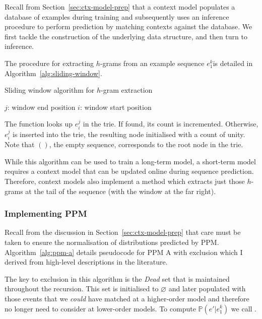\documentclass[12pt,a4paper,twoside,openright]{report}
\newcommand{\sref}[1]{Section~\ref{#1}}
\begin{document}
Recall from \sref{sec:ctx-model-prep} that a context model populates a
database of examples during training and subsequently uses an inference
procedure to perform prediction by matching contexts against the database. We
first tackle the construction of the underlying data structure, and then turn to
inference.

The procedure for extracting $h$-grams from an example sequence $e_1^k$is
detailed in Algorithm~\ref{alg:sliding-window}.

\begin{algorithm}[H]
  \caption{Sliding window algorithm for $h$-gram extraction}
  \label{alg:sliding-window}
  \begin{algorithmic}[1]
      \Comment $j$: window end position
        \State {}
        \Comment $i$: window start position
          \State {}
        \EndFor
      \EndFor
    \EndFunction
  \end{algorithmic}
\end{algorithm}

The function  looks up $e_i^j$ in the trie. If
found, its count is incremented. Otherwise, $e_i^j$ is inserted into the trie,
the resulting node initialised with a count of unity. Note that $()$, the empty
sequence, corresponds to the root node in the trie. 

While this algorithm can be used to train a long-term model, a short-term model
requires a context model that can be updated online during sequence prediction.
Therefore, context models also implement a method which extracts just those
$h$-grams at the tail of the sequence (with the window at the far right).

\subsubsection{Implementing PPM}\label{subsec:ppm-imp}

Recall from the discussion in \sref{sec:ctx-model-prep} that care must be
taken to ensure the normalisation of distributions predicted by PPM.
Algorithm~\ref{alg:ppm-a} details pseudocode for PPM A with exclusion which I
derived from high-level descriptions in the literature. 

The key to exclusion in this algorithm is the \textit{Dead} set that is
maintained throughout the recursion. This set is initialised to $\varnothing$
and later populated with those events that we \emph{could} have matched at a
higher-order model and therefore no longer need to consider at lower-order
models. To compute $\mathbb{P}(e' | e_1^k)$ we call .
\end{document}
